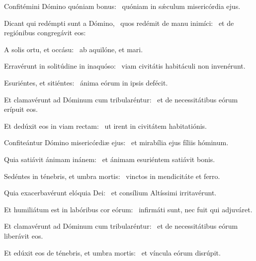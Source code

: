 \item Confitémini Dómino quóniam bonus:~\psstar{} quóniam in sǽculum misericórdia ejus.

\item Dicant qui redémpti sunt a Dómino,~\pscross{} quos redémit de manu inimíci:~\psstar{} et de regiónibus congregávit eos:

\item A solis ortu, et occásu:~\psstar{} ab aquilóne, et mari.

\item Erravérunt in solitúdine in inaquóso:~\psstar{} viam civitátis habitáculi non invenérunt.

\item Esuriéntes, et sitiéntes:~\psstar{} ánima eórum in ipsis defécit.

\item Et clamavérunt ad Dóminum cum tribularéntur:~\psstar{} et de necessitátibus eórum erípuit eos.

\item Et dedúxit eos in viam rectam:~\psstar{} ut irent in civitátem habitatiónis.

\item Confiteántur Dómino misericórdiæ ejus:~\psstar{} et mirabília ejus fíliis hóminum.

\item Quia satiávit ánimam inánem:~\psstar{} et ánimam esuriéntem satiávit bonis.

\item Sedéntes in ténebris, et umbra mortis:~\psstar{} vinctos in mendicitáte et ferro.

\item Quia exacerbavérunt elóquia Dei:~\psstar{} et consílium Altíssimi irritavérunt.

\item Et humiliátum est in labóribus cor eórum:~\psstar{} infirmáti sunt, nec fuit qui adjuváret.

\item Et clamavérunt ad Dóminum cum tribularéntur:~\psstar{} et de necessitátibus eórum liberávit eos.

\item Et edúxit eos de ténebris, et umbra mortis:~\psstar{} et víncula eórum disrúpit.
